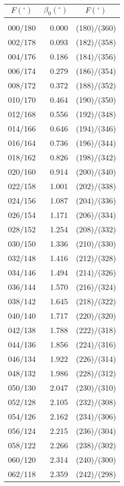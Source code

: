 \newpage
\begin{table}\centering
\small{ \begin{tabular}{crc}
$F (^\circ)$ & $\beta_0(^\circ)$ &
$F (^\circ)$ \\\hline
&&\\[-1.75ex]
000/180 &  0.000 & (180)/(360)\\
002/178 &  0.093 & (182)/(358)\\
004/176 &  0.186 & (184)/(356)\\
006/174 &  0.279 & (186)/(354)\\
008/172 &  0.372 & (188)/(352)\\
010/170 &  0.464 & (190)/(350)\\
012/168 &  0.556 & (192)/(348)\\
014/166 &  0.646 & (194)/(346)\\
016/164 &  0.736 & (196)/(344)\\
018/162 &  0.826 & (198)/(342)\\
020/160 &  0.914 & (200)/(340)\\
022/158 &  1.001 & (202)/(338)\\
024/156 &  1.087 & (204)/(336)\\
026/154 &  1.171 & (206)/(334)\\
028/152 &  1.254 & (208)/(332)\\
030/150 &  1.336 & (210)/(330)\\
032/148 &  1.416 & (212)/(328)\\
034/146 &  1.494 & (214)/(326)\\
036/144 &  1.570 & (216)/(324)\\
038/142 &  1.645 & (218)/(322)\\
040/140 &  1.717 & (220)/(320)\\
042/138 &  1.788 & (222)/(318)\\
044/136 &  1.856 & (224)/(316)\\
046/134 &  1.922 & (226)/(314)\\
048/132 &  1.986 & (228)/(312)\\
050/130 &  2.047 & (230)/(310)\\
052/128 &  2.105 & (232)/(308)\\
054/126 &  2.162 & (234)/(306)\\
056/124 &  2.215 & (236)/(304)\\
058/122 &  2.266 & (238)/(302)\\
060/120 &  2.314 & (240)/(300)\\
062/118 &  2.359 & (242)/(298)\\

\end{tabular}}
\end{table}
